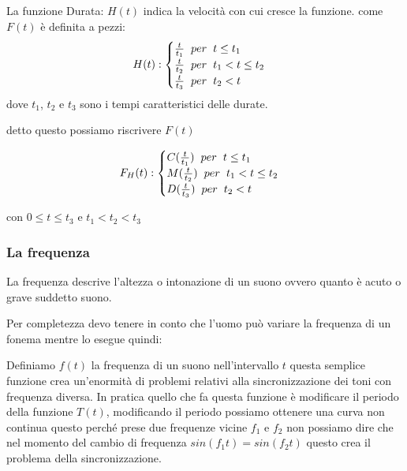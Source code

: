 \documentclass{article}
\begin{document}
La funzione Durata: $H(t)$ indica la velocità con cui cresce la funzione. come $F(t)$ è definita a pezzi:
$$H(t) :
\begin{cases}
	\frac{t}{t_1} \hspace{0.2cm}per\hspace{0.2cm} t \le t_1 \\
	\frac{t}{t_2} \hspace{0.2cm}per\hspace{0.2cm} t_1 < t \le t_2\\
	\frac{t}{t_3} \hspace{0.2cm}per\hspace{0.2cm} t_2 < t
\end{cases}
$$
dove $t_1$, $t_2$ e $t_3$ sono i tempi caratteristici delle durate.

detto questo possiamo riscrivere $F(t)$

$$F_H(t) :
\begin{cases}
	C(\frac{t}{t_1}) \hspace{0.2cm}per\hspace{0.2cm} t \le t_1 \\
	M(\frac{t}{t_2}) \hspace{0.2cm}per\hspace{0.2cm} t_1 < t \le t_2\\
	D(\frac{t}{t_3}) \hspace{0.2cm}per\hspace{0.2cm} t_2 < t
\end{cases}
$$

con $0 \le t \le t_3$ e $t_1 < t_2 < t_3$

\subsubsection{La frequenza}
La frequenza descrive l'altezza o intonazione di un suono ovvero quanto è acuto o grave suddetto suono.

Per completezza devo tenere in conto che l'uomo può variare la frequenza di un fonema mentre lo esegue quindi:

Definiamo $f(t)$ la frequenza di un suono nell'intervallo $t$ questa semplice funzione crea un'enormità di problemi relativi alla sincronizzazione dei toni con frequenza diversa.
In pratica quello che fa questa funzione è modificare il periodo della funzione $T(t)$, modificando il periodo possiamo ottenere una curva non continua questo perché prese due frequenze vicine $f_1$ e $f_2$ non possiamo dire che nel momento del cambio di frequenza $sin(f_1t) = sin (f_2t)$ questo crea il problema della sincronizzazione.
\end{document}
